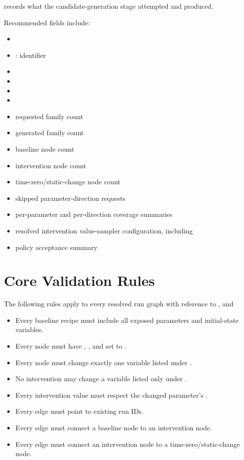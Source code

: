 \documentclass[11pt]{article}
\begin{document}
 records what the candidate-generation stage attempted and produced.

Recommended fields include:

\begin{itemize}
\item {}
\item {}: \termSimulator identifier
\item {}
\item {}
\item {}
\item {}
\item requested family count
\item generated family count
\item baseline node count
\item intervention node count
\item time-zero/static-change node count
\item skipped parameter-direction requests
\item per-parameter and per-direction coverage summaries
\item resolved intervention value-sampler configuration, including 
\item policy acceptance summary
\end{itemize}


\section*{Core Validation Rules}

The following rules apply to every resolved run graph with reference to ,  and 

\begin{itemize}
\item Every baseline recipe must include all exposed parameters and initial-state variables.
\item Every  node must have , , and  set to .
\item Every  node must change exactly one variable listed under .
\item No intervention may change a variable listed only under .
\item Every intervention value must respect the changed parameter's .
\item Every edge must point to existing run IDs.
\item Every  edge must connect a baseline node to an intervention node.
\item Every  edge must connect an intervention node to a time-zero/static-change node.
\end{itemize}
\end{document}
